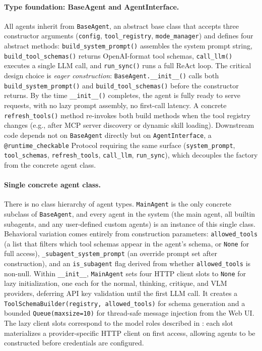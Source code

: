 \paragraph{Type foundation: BaseAgent and AgentInterface.}
All agents inherit from \texttt{BaseAgent}, an abstract base class that accepts three constructor arguments (\texttt{config}, \texttt{tool\_registry}, \texttt{mode\_manager}) and defines four abstract methods: \texttt{build\_system\_prompt()} assembles the system prompt string, \texttt{build\_tool\_schemas()} returns OpenAI-format tool schemas, \texttt{call\_llm()} executes a single LLM call, and \texttt{run\_sync()} runs a full ReAct loop. The critical design choice is \emph{eager construction}: \texttt{BaseAgent.\_\_init\_\_()} calls both \texttt{build\_system\_prompt()} and \texttt{build\_tool\_schemas()} before the constructor returns. By the time \texttt{\_\_init\_\_()} completes, the agent is fully ready to serve requests, with no lazy prompt assembly, no first-call latency. A concrete \texttt{refresh\_tools()} method re-invokes both build methods when the tool registry changes (e.g., after MCP server discovery or dynamic skill loading). Downstream code depends not on \texttt{BaseAgent} directly but on \texttt{AgentInterface}, a \texttt{@runtime\_checkable} Protocol requiring the same surface (\texttt{system\_prompt}, \texttt{tool\_schemas}, \texttt{refresh\_tools}, \texttt{call\_llm}, \texttt{run\_sync}), which decouples the factory from the concrete agent class.

\paragraph{Single concrete agent class.}
There is no class hierarchy of agent types. \texttt{MainAgent} is the only concrete subclass of \texttt{BaseAgent}, and every agent in the system (the main agent, all builtin subagents, and any user-defined custom agents) is an instance of this single class. Behavioral variation comes entirely from construction parameters: \texttt{allowed\_tools} (a list that filters which tool schemas appear in the agent's schema, or \texttt{None} for full access), \texttt{\_subagent\_system\_prompt} (an override prompt set after construction), and an \texttt{is\_subagent} flag derived from whether \texttt{allowed\_tools} is non-null. Within \texttt{\_\_init\_\_}, \texttt{MainAgent} sets four HTTP client slots to \texttt{None} for lazy initialization, one each for the normal, thinking, critique, and VLM providers, deferring API key validation until the first LLM call. It creates a \texttt{ToolSchemaBuilder(registry, allowed\_tools)} for schema generation and a bounded \texttt{Queue(maxsize=10)} for thread-safe message injection from the Web UI. The lazy client slots correspond to the model roles described in : each slot materializes a provider-specific HTTP client on first access, allowing agents to be constructed before credentials are configured.

